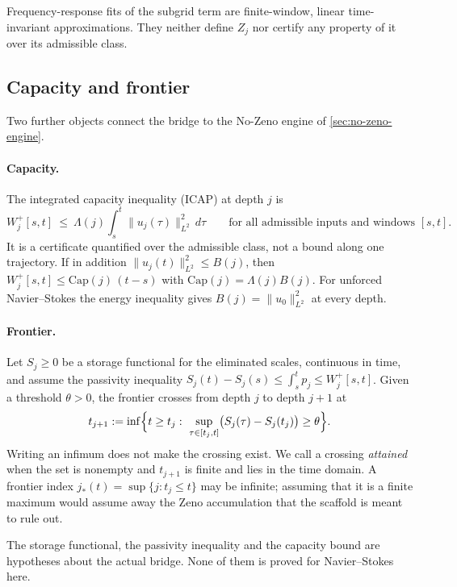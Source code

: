 Frequency-response fits of the subgrid term are finite-window, linear time-invariant
approximations. They neither define $Z_j$ nor certify any property of it over its admissible class.

\subsection{Capacity and frontier}\label{sec:capacity-frontier}

Two further objects connect the bridge to the No-Zeno engine of \cref{sec:no-zeno-engine}.

\paragraph{Capacity.} The integrated capacity inequality (ICAP) at depth $j$ is
\begin{equation}\label{eq:icap}
W_j^+[s,t]\ \le\ \Lambda(j)\int_s^t\|u_j(\tau)\|_{L^2}^2\,d\tau\qquad\text{for all admissible inputs and windows }[s,t].
\end{equation}
It is a certificate quantified over the admissible class, not a bound along one trajectory. If in
addition $\|u_j(t)\|_{L^2}^2\le B(j)$, then $W_j^+[s,t]\le \mathrm{Cap}(j)\,(t-s)$ with
$\mathrm{Cap}(j)=\Lambda(j)B(j)$. For unforced Navier--Stokes the energy inequality gives
$B(j)=\|u_0\|_{L^2}^2$ at every depth.

\paragraph{Frontier.} Let $S_j\ge0$ be a storage functional for the eliminated scales, continuous in
time, and assume the passivity inequality $S_j(t)-S_j(s)\le\int_s^tp_j\le W_j^+[s,t]$. Given a
threshold $\theta>0$, the frontier crosses from depth $j$ to depth $j+1$ at
\[
t_{j+1}:=\inf\Bigl\{t\ge t_j:\ \sup_{\tau\in[t_j,t]}\bigl(S_j(\tau)-S_j(t_j)\bigr)\ge\theta\Bigr\}.
\]
Writing an infimum does not make the crossing exist. We call a crossing \emph{attained} when the
set is nonempty and $t_{j+1}$ is finite and lies in the time domain. A frontier index
$j_\ast(t)=\sup\{j:t_j\le t\}$ may be infinite; assuming that it is a finite maximum would assume
away the Zeno accumulation that the scaffold is meant to rule out.

The storage functional, the passivity inequality and the capacity bound are hypotheses about the
actual bridge. None of them is proved for Navier--Stokes here.
